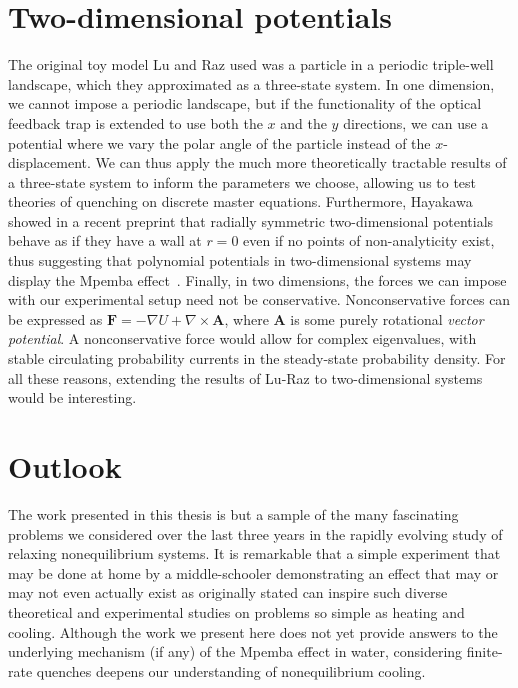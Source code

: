 \documentclass[hyperref={colorlinks=true, urlcolor=blue, citecolor=blue, final, bound}]{sfuthesis}
\begin{document}
\section{Two-dimensional potentials}
The original toy model Lu and Raz used was a particle in a periodic triple-well landscape, which they approximated as a three-state system. In one dimension, we cannot impose a periodic landscape, but if the functionality of the optical feedback trap is extended to use both the $x$ and the $y$ directions, we can use a potential where we vary the polar angle of the particle instead of the $x$-displacement. We can thus apply the much more theoretically tractable results of a three-state system to inform the parameters we choose, allowing us to test theories of quenching on discrete master equations. Furthermore, Hayakawa showed in a recent preprint that radially symmetric two-dimensional potentials behave as if they have a wall at $r=0$ even if no points of non-analyticity exist, thus suggesting that polynomial potentials in two-dimensional systems may display the Mpemba effect~\cite{Hayakawa2026}. Finally, in two dimensions, the forces we can impose with our experimental setup need not be conservative. Nonconservative forces can be expressed as $\mathbf F = -\nabla U + \nabla\times\mathbf A$, where $\mathbf A$ is some purely rotational \textit{vector potential}. A nonconservative force would allow for complex eigenvalues, with stable circulating probability currents in the steady-state probability density. For all these reasons, extending the results of Lu-Raz to two-dimensional systems would be interesting.

\section{Outlook}
The work presented in this thesis is but a sample of the many fascinating problems we considered over the last three years in the rapidly evolving study of relaxing nonequilibrium systems. It is remarkable that a simple experiment that may be done at home by a middle-schooler demonstrating an effect that may or may not even actually exist as originally stated can inspire such diverse theoretical and experimental studies on problems so simple as heating and cooling. Although the work we present here does not yet provide answers to the underlying mechanism (if any) of the Mpemba effect in water, considering finite-rate quenches deepens our understanding of nonequilibrium cooling.
\end{document}
